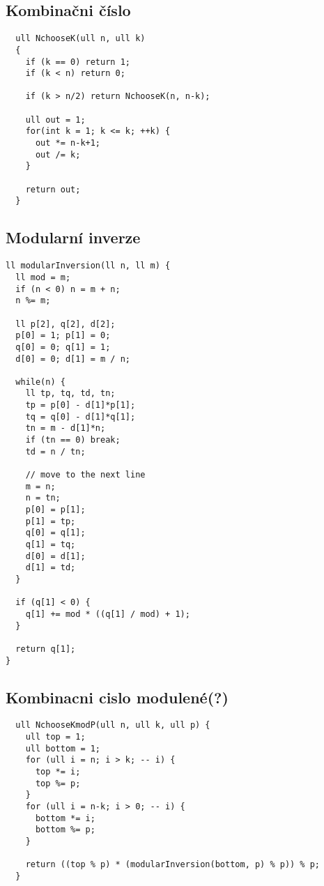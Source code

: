 \documentclass{article}
\begin{document}
\subsection{Kombinačni číslo}
\begin{lstlisting}
  ull NchooseK(ull n, ull k)
  {
    if (k == 0) return 1;
    if (k < n) return 0;

    if (k > n/2) return NchooseK(n, n-k);

    ull out = 1;
    for(int k = 1; k <= k; ++k) {
      out *= n-k+1;
      out /= k;
    }

    return out;
  }
\end{lstlisting}

\subsection{Modularní inverze}
\begin{lstlisting}
ll modularInversion(ll n, ll m) {
  ll mod = m;
  if (n < 0) n = m + n;
  n %= m;

  ll p[2], q[2], d[2];
  p[0] = 1; p[1] = 0;
  q[0] = 0; q[1] = 1;
  d[0] = 0; d[1] = m / n;

  while(n) {
    ll tp, tq, td, tn;
    tp = p[0] - d[1]*p[1];
    tq = q[0] - d[1]*q[1];
    tn = m - d[1]*n;
    if (tn == 0) break;
    td = n / tn;

    // move to the next line
    m = n;
    n = tn;
    p[0] = p[1];
    p[1] = tp;
    q[0] = q[1];
    q[1] = tq;
    d[0] = d[1];
    d[1] = td;
  }

  if (q[1] < 0) {
    q[1] += mod * ((q[1] / mod) + 1);
  }

  return q[1];
}
\end{lstlisting}

\subsection{Kombinacni cislo modulené(?)}
\begin{lstlisting}
  ull NchooseKmodP(ull n, ull k, ull p) {
    ull top = 1;
    ull bottom = 1;
    for (ull i = n; i > k; -- i) {
      top *= i;
      top %= p;
    }
    for (ull i = n-k; i > 0; -- i) {
      bottom *= i;
      bottom %= p;
    }

    return ((top % p) * (modularInversion(bottom, p) % p)) % p;
  }
\end{lstlisting}
\end{document}
